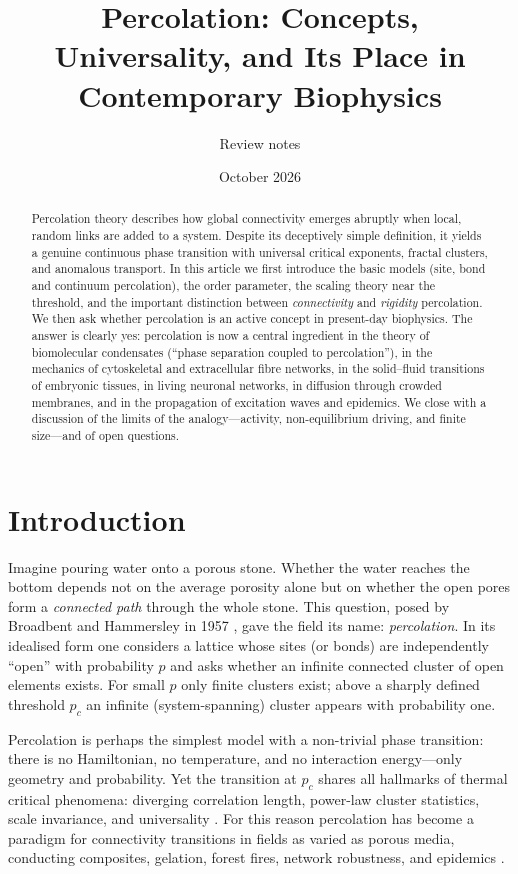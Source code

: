 \documentclass[11pt]{article}
\title{\textbf{Percolation: Concepts, Universality, and Its Place in\\ Contemporary Biophysics}}
\author{Review notes}
\date{October 2026}
\begin{document}
\maketitle

\begin{abstract}
Percolation theory describes how global connectivity emerges abruptly when local, random links are added to a system. Despite its deceptively simple definition, it yields a genuine continuous phase transition with universal critical exponents, fractal clusters, and anomalous transport. In this article we first introduce the basic models (site, bond and continuum percolation), the order parameter, the scaling theory near the threshold, and the important distinction between \emph{connectivity} and \emph{rigidity} percolation. We then ask whether percolation is an active concept in present-day biophysics. The answer is clearly yes: percolation is now a central ingredient in the theory of biomolecular condensates (``phase separation coupled to percolation''), in the mechanics of cytoskeletal and extracellular fibre networks, in the solid--fluid transitions of embryonic tissues, in living neuronal networks, in diffusion through crowded membranes, and in the propagation of excitation waves and epidemics. We close with a discussion of the limits of the analogy---activity, non-equilibrium driving, and finite size---and of open questions.
\end{abstract}

\section{Introduction}

Imagine pouring water onto a porous stone. Whether the water reaches the bottom depends not on the average porosity alone but on whether the open pores form a \emph{connected path} through the whole stone. This question, posed by Broadbent and Hammersley in 1957 \cite{Broadbent1957}, gave the field its name: \emph{percolation}. In its idealised form one considers a lattice whose sites (or bonds) are independently ``open'' with probability $p$ and asks whether an infinite connected cluster of open elements exists. For small $p$ only finite clusters exist; above a sharply defined threshold $p_c$ an infinite (system-spanning) cluster appears with probability one.

Percolation is perhaps the simplest model with a non-trivial phase transition: there is no Hamiltonian, no temperature, and no interaction energy---only geometry and probability. Yet the transition at $p_c$ shares all hallmarks of thermal critical phenomena: diverging correlation length, power-law cluster statistics, scale invariance, and universality \cite{StaufferAharony,Christensen2005}. For this reason percolation has become a paradigm for connectivity transitions in fields as varied as porous media, conducting composites, gelation, forest fires, network robustness, and epidemics \cite{Sahimi1994,Newman2002,Callaway2000}.
\end{document}
